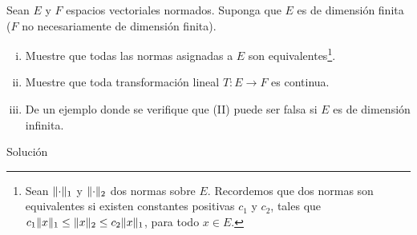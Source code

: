\begin{homeworkProblem}
  Sean $E$ y $F$ espacios vectoriales normados. Suponga que $E$ es de dimensión finita ($F$ no necesariamente de dimensión finita).
  \begin{enumerate}[(i)]
    \item Muestre que todas las normas asignadas a $E$ son equivalentes\footnote{Sean $\lVert\cdot\rVert_{1}$ y $\lVert\cdot\rVert_{2}$ dos normas sobre $E$. Recordemos que dos normas son equivalentes si existen constantes positivas $c_1$ y $c_2$, tales que $c_1\lVert x\rVert_{1}\leq \lVert x\rVert_{2}\leq c_2\lVert x\rVert_{1}$, para todo $x\in E$.}.
    \item Muestre que toda transformación lineal $T:E\to F$ es continua.
    \item De un ejemplo donde se verifique que (II) puede ser falsa si $E$ es de dimensión infinita. 
  \end{enumerate}
  \begin{solution}
    Solución
  \end{solution}
\end{homeworkProblem}

